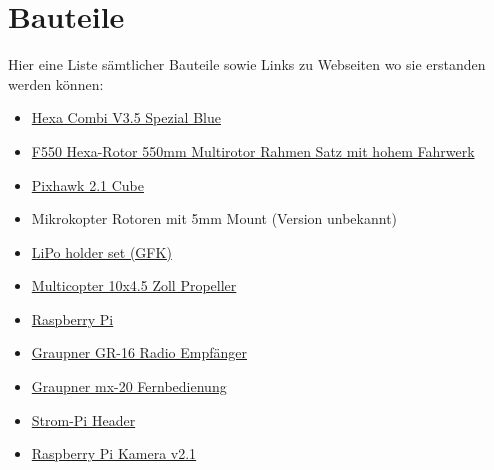 \documentclass[12pt]{article}
\begin{document}
\section{Bauteile}
Hier eine Liste sämtlicher Bauteile sowie Links zu Webseiten wo sie erstanden werden können:

\begin{itemize}
\item \hyperlink{https://www.mikrocontroller.com/index.php?main_page=product_info&cPath=118&products_id=982&zenid=b6be99e330bf2731f5e26a2851f71135}{Hexa Combi V3.5 Spezial Blue}


\item \hyperlink{https://www.banggood.com/de/DIY-F550-Hexa-Rotor-550mm-Multirotor-Frame-Kit-with-High-Landing-Gear-p-1219845.html?gmcCountry=DE&currency=EUR&createTmp=1&utm_source=googleshopping&utm_medium=cpc_ods&utm_content=heath&utm_campaign=pla-multi-de-pc-de&gclid=CjwKCAjw39reBRBJEiwAO1m0OZklnYM2pnmIwtXVHE9hkqoJ0zF87nakEFZQ_GaRAJ4BwLxnjM2hBRoCT34QAvD_BwE&cur_warehouse=CN}{F550 Hexa-Rotor 550mm Multirotor Rahmen Satz mit hohem Fahrwerk }


\item \hyperlink{https://www.robotshop.com/de/de/pixhawk-21-standardsatz.html?gclid=CjwKCAjw39reBRBJEiwAO1m0ObB_4aML5dLEjC1-HvetLBilRCW_KZrGHZKMNqfyqW33_o0fvH1MTxoC-pUQAvD_BwE}{Pixhawk 2.1 Cube}

\item Mikrokopter Rotoren mit 5mm Mount (Version unbekannt)

\item \hyperlink{https://www.mikrocontroller.com/index.php?main_page=product_info&cPath=77&products_id=560&zenid=b6be99e330bf2731f5e26a2851f71135}{LiPo holder set (GFK)}

\item \hyperlink{https://www.conrad.de/de/apc-propeller-2-blatt-multicopter-propeller-set-10-x-45-zoll-254-x-114-cm-apcb10045mr-1530779.html}{Multicopter 10x4.5 Zoll Propeller}
\item \hyperlink{https://www.reichelt.de/raspberry-pi-3-b-4x-1-4-ghz-1-gb-ram-wlan-bt-raspberry-pi-3b-p217696.html?&trstct=lsbght_sldr::232866}{Raspberry Pi}

\item \hyperlink{https://www.graupner.de/Empfaenger-GR-16-HoTT-2-4-GHz-8-Kanal/33508/}{Graupner GR-16 Radio Empfänger}
\item \hyperlink{https://www.graupner.de/Fernsteuerung-mx-20-HoTT-DE-12-Kanal/33124.77/}{Graupner mx-20 Fernbedienung}
\item \hyperlink{https://www.reichelt.de/raspberry-pi-der-strompi-3-rasp-strom-pi-3-p232866.html}{Strom-Pi Header}

\item \hyperlink{https://www.reichelt.de/raspberry-pi-kamera-8mp-v2-1-rasp-cam-2-p170853.html?&trstct=pos_1}{Raspberry Pi Kamera v2.1}

\end{itemize}
\end{document}
